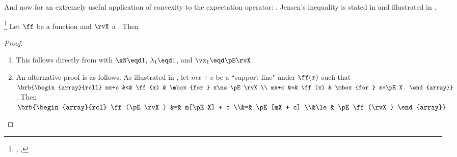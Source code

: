 And now for an extremely useful application of convexity to the
expectation operator: .
Jensen's inequality is stated in 
and illustrated in .
\begin{theorem}
\footnote{
  ,
  ,
  }
\label{thm:jensen}
Let $\ff$ be a function and $\rvX$ a . Then
\end{theorem}
\begin{proof}
\begin{enumerate}
  \item This follows directly from  
        with $\xN\eqd1$, $\lambda_1\eqd1$, and $\vx_1\eqd\pE\rvX$.

  \item An alternative proof is as follows: 
        As illustrated in , 
        let $mx+c$ be a ``support line" under $\ff(x)$ such that
        \\\indentx
          $\brb{\begin{array}{rcll}
            mx+c &<& \ff(x) & \mbox{for } x\ne \pE\rvX \\
            mx+c &=& \ff(x) & \mbox{for } x=\pE X.
          \end{array}}$.
        \qquad
        Then
        $\brb{\begin{array}{rcl}
          \ff(\pE\rvX)
            &=&   m[\pE X] + c
          \\&=&   \pE[mX + c]
          \\&\le& \pE\ff(\rvX)
        \end{array}}$
\end{enumerate}
\end{proof}


